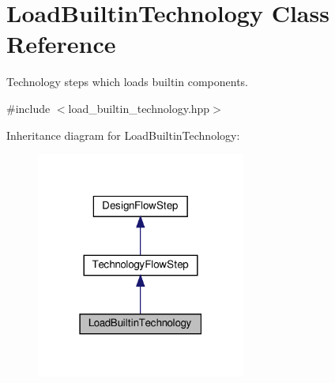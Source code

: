 \hypertarget{classLoadBuiltinTechnology}{}\section{Load\+Builtin\+Technology Class Reference}
\label{classLoadBuiltinTechnology}


Technology steps which loads builtin components.  




{\ttfamily \#include $<$load\+\_\+builtin\+\_\+technology.\+hpp$>$}



Inheritance diagram for Load\+Builtin\+Technology\+:
\nopagebreak
\begin{figure}[H]
\begin{center}
\leavevmode
\includegraphics[width=195pt]{d8/df3/classLoadBuiltinTechnology__inherit__graph}
\end{center}
\end{figure}


